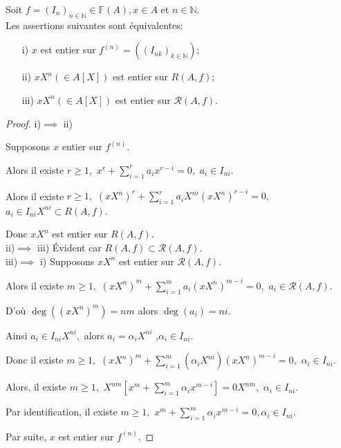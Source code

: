 \begin{maproposition}
	\label{maprop1}
	Soit $f=(I_n)_{n \in \mathbb{N}} \in \mathbb{F}(A), x \in A $ et $n \in \mathbb{N}$.\\
	Les assertions suivantes sont équivalentes: \\
	\begin{enumerate}
		\item[i)] $x$ est entier sur $f^{(n)}=((I_{nk})_{k \in \mathbb{N}})$;
		\item[ii)] $xX^n(\in A[X])$ est entier sur $R(A,f)$;
		\item[iii)] $xX^n(\in A[X])$ est entier sur $ \mathcal{R}(A,f)$.
	\end{enumerate}
	\begin{proof}
		i)$\implies$ ii)
		
		Supposons $x$ entier sur $f^{(n)}$.
		
		Alors il existe $r\geq 1,$ $x^{r}+\sum\limits_{i=1}^{r}a_{i}x^{r-i}=0,$ $a_{i}\in I_{ni}$.
		
		Alors il existe $r\geq 1,$ $(xX^{n})^{r}+\sum
		\limits_{i=1}^{r}a_{i}X^{ni}(xX^{n})^{r-i}=0,$ $a_{i}\in I_{ni} X^{ni} \subset R(A,f)$.
		
		Donc $xX^{n}$ est entier sur $R(A,f).$ \\
		
		ii)$\implies$ iii) Évident car $R(A,f)\subset \mathcal{R}(A,f).$ \\
		iii)$\implies$ i) Supposons $xX^{n}$ est entier sur $\mathcal{R}(A,f).$
		
		Alors il existe $m\geq 1,$ $(xX^{n})^{m}+\sum\limits_{i=1}^{m}a_{i}(xX^{n})^{m-i}=0,$ $a_{i}\in \mathcal{R}(A,f)$.
		
		D'où $\deg ((xX^{n})^{m})=nm$ alors $\deg (a_{i})=ni.$
		
		Ainsi $a_{i}\in I_{ni}X^{ni},$ alors $a_{i}=\alpha _{i}X^{ni}$ ,$\alpha _{i}\in I_{ni}$.
		
		Donc il existe $m\geq 1,$ $(xX^{n})^{m}+\sum\limits_{i=1}^{m}(\alpha
		_{i}X^{ni})(xX^{n})^{m-i}=0,$ $\alpha _{i}\in I_{ni}$.
		
		Alors, il existe $m\geq 1,$ $X^{nm}[x^{m}+\sum\limits_{i=1}^{m}\alpha
		_{i}x^{m-i}]=0X^{nm},$ $\alpha _{i}\in I_{ni}$.
		
		Par identification, il existe $m\geq 1,$ $ x^{m}+\sum\limits_{i=1}^{m}\alpha _{i}x^{m-i}=0,\alpha _{i}\in I_{ni}$.
		
		Par suite, $x$ est entier sur $f^{(n)}$.
	\end{proof}
\end{maproposition}
